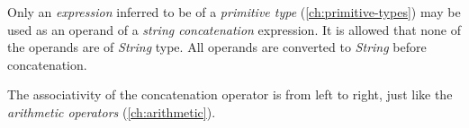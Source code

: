 Only an \emph{expression} inferred to be of a \emph{primitive type} (\ref{ch:primitive-types})
may be used as an operand of a \emph{string concatenation} expression.
It is allowed that none of the operands are of \emph{String} type.
All operands are converted to \emph{String} before concatenation.

The associativity of the concatenation operator is from left to right,
just like the \emph{arithmetic operators} (\ref{ch:arithmetic}).
